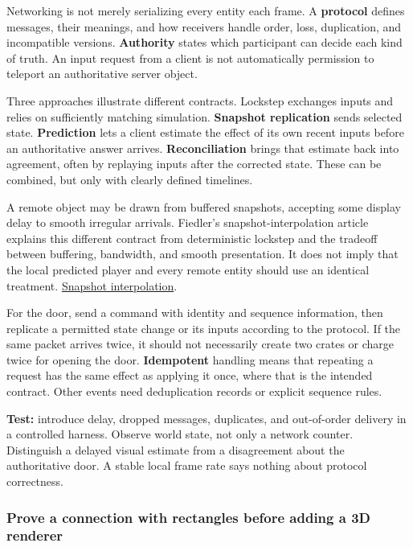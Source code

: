Networking is not merely serializing every entity each frame. A \textbf{protocol} defines messages, their meanings, and how receivers handle order, loss, duplication, and incompatible versions. \textbf{Authority} states which participant can decide each kind of truth. An input request from a client is not automatically permission to teleport an authoritative server object.

Three approaches illustrate different contracts. Lockstep exchanges inputs and relies on sufficiently matching simulation. \textbf{Snapshot replication} sends selected state. \textbf{Prediction} lets a client estimate the effect of its own recent inputs before an authoritative answer arrives. \textbf{Reconciliation} brings that estimate back into agreement, often by replaying inputs after the corrected state. These can be combined, but only with clearly defined timelines.

A remote object may be drawn from buffered snapshots, accepting some display delay to smooth irregular arrivals. Fiedler's snapshot-interpolation article explains this different contract from deterministic lockstep and the tradeoff between buffering, bandwidth, and smooth presentation. It does not imply that the local predicted player and every remote entity should use an identical treatment. \href{https://gafferongames.com/post/snapshot_interpolation/}{Snapshot interpolation}.

For the door, send a command with identity and sequence information, then replicate a permitted state change or its inputs according to the protocol. If the same packet arrives twice, it should not necessarily create two crates or charge twice for opening the door. \textbf{Idempotent} handling means that repeating a request has the same effect as applying it once, where that is the intended contract. Other events need deduplication records or explicit sequence rules.

\textbf{Test:} introduce delay, dropped messages, duplicates, and out-of-order delivery in a controlled harness. Observe world state, not only a network counter. Distinguish a delayed visual estimate from a disagreement about the authoritative door. A stable local frame rate says nothing about protocol correctness.

\subsubsection{Prove a connection with rectangles before adding a 3D renderer}\label{06-engine-ii-ch040-prove-a-connection-with-rectangles-before-adding-a-3d-renderer}

